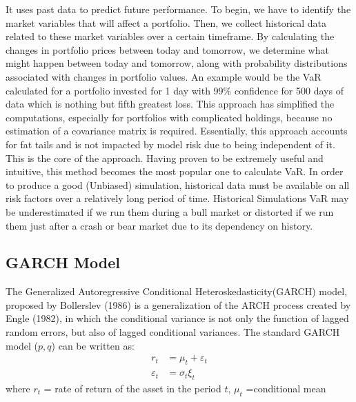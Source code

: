 \documentclass[a4paper,11pt,oneside]{book}
\begin{document}
It uses past data to predict future performance. To begin, we have to identify the market variables that will affect a portfolio. Then, we collect historical data related to these market variables over a certain timeframe. By calculating the changes in portfolio prices between today and tomorrow, we determine what might happen between today and tomorrow, along with probability distributions associated with changes in portfolio values. An example would be the VaR calculated for a portfolio invested for 1 day with 99\% confidence for 500 days of data which is nothing but fifth greatest loss.
\newline\newline This approach has simplified the computations, especially for portfolios with complicated holdings, because no estimation of a covariance matrix is required.\newline\newline
Essentially, this approach accounts for fat tails and is not impacted by model risk due to being independent of it. This is the core of the approach. Having proven to be extremely useful and intuitive, this method becomes the most popular one to calculate VaR. In order to produce a good (Unbiased) simulation, historical data must be available on all risk factors over a relatively long period of time. Historical Simulations VaR may be underestimated if we run them during a bull market or distorted if we run them just after a crash or bear market due to its dependency on history.
\subsection{GARCH Model}
The Generalized Autoregressive Conditional Heteroskedasticity(GARCH) model, proposed by Bollerslev
(1986) is a generalization of the ARCH process created by
Engle (1982), in which the conditional variance is not only
the function of lagged random errors, but also of lagged
conditional variances. The standard GARCH model ($p,q$)
can be written as:
\begin{equation}
\begin{aligned}
r_t &= \mu_t + \varepsilon_t
\\
\varepsilon_t &= \sigma_t \xi_t 
\label{6}
\end{aligned}
\end{equation}
where $r_t$ = rate of return of the asset in the period $t$,\newline
$\mu_t$ =conditional mean \newline
\end{document}

